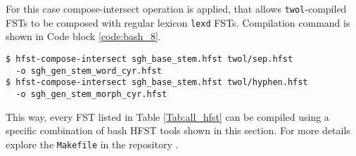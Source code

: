 For this case compose-intersect operation is applied, that allows \texttt{twol}-compiled FSTs to be composed with regular lexicon \texttt{lexd} FSTs. Compilation command is shown in Code block \ref{code:bash_8}.

\begin{code_frame}[float]
    \begin{verbatim}
$ hfst-compose-intersect sgh_base_stem.hfst twol/sep.hfst 
  -o sgh_gen_stem_word_cyr.hfst
$ hfst-compose-intersect sgh_base_stem.hfst twol/hyphen.hfst 
  -o sgh_gen_stem_morph_cyr.hfst
    \end{verbatim}
    \tcblower
    \label{code:bash_8}
\end{code_frame}

This way, every FST listed in Table \ref{Tab:all_hfst} can be compiled using a specific combination of bash HFST tools shown in this section. For more details explore the \texttt{Makefile} in the repository \parencite{kartina_2025_repo}. 

